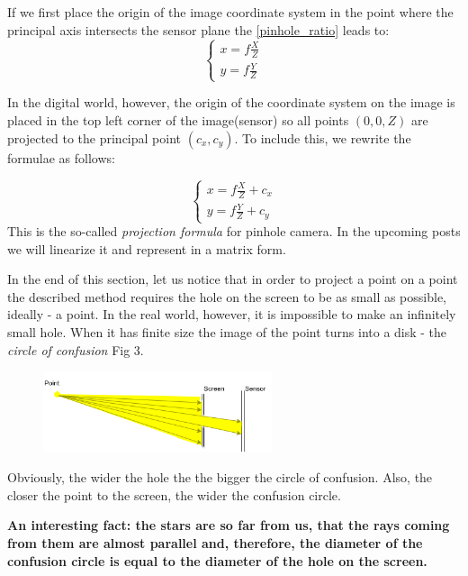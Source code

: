 \documentclass[a4paper,10pt]{article}
\begin{document}
If we first place the origin of the image coordinate system in the point where the principal axis intersects the sensor plane the \eqref{pinhole_ratio} leads to:
$$
\left\{\begin{array}{c}
x = f \frac{X}{Z} \\
y = f \frac{Y}{Z} 
\end{array}\right.
$$

In the digital world, however, the origin of the coordinate system on the image is placed in the top left corner of the image(sensor) so all points $(0,0,Z)$ are projected to the principal point $(c_x, c_y)$.  To include this, we rewrite the formulae as follows:  

\begin{equation}
\left\{\begin{array}{c}
x = f \frac{X}{Z} + c_x\\ 
y = f \frac{Y}{Z} + c_y
\end{array}\right.\label{projinhmg}
\end{equation}
This is the so-called {\it projection formula} for pinhole camera. In the upcoming posts we will linearize it  and represent in a matrix form. 

In the end of this section, let us notice that in order to project a point on a point the described method requires the hole on the screen to be as small as possible, ideally - a point.  In the real world, however, it is impossible to make an infinitely small hole. When it has finite size the image of the point turns into a disk - the {\it circle of confusion  } Fig 3.
\begin{figure}[h]
\centering
 \includegraphics[width=0.6\textwidth]{../../images/confusion_circle.png}
 \caption{}
\end{figure}

Obviously, the wider the hole the the bigger the  circle of confusion. Also, the closer the point to the screen, the wider the confusion circle. 

{\bf\tiny An interesting fact: the stars are so far from us, that the rays coming from them are almost parallel and, therefore, the diameter of the confusion circle is equal to the diameter of the hole on the screen.}
\end{document}
